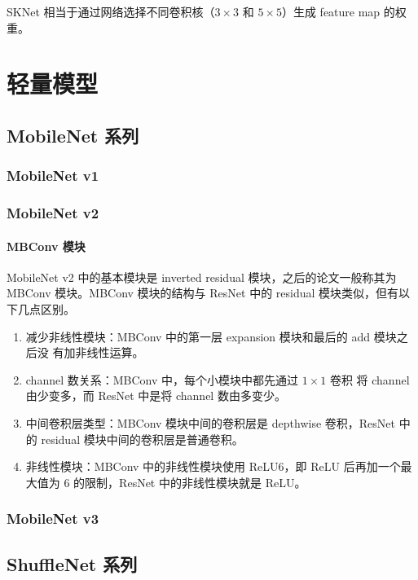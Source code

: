 SKNet 相当于通过网络选择不同卷积核（$3 \times 3$ 和 $5 \times 5$）生成 feature
map 的权重。

\chapter{轻量模型}

\section{MobileNet 系列}
\subsection{MobileNet v1}

\subsection{MobileNet v2}
\label{subsec:MobileNetv2}

\subsubsection{MBConv 模块}
MobileNet v2 中的基本模块是 inverted residual 模块，之后的论文一般称其为 MBConv
模块。MBConv 模块的结构与 ResNet 中的 residual 模块类似，但有以下几点区别。

\begin{enumerate}
  \item 减少非线性模块：MBConv 中的第一层 expansion 模块和最后的 add 模块之后没
    有加非线性运算。
  \item channel 数关系：MBConv 中，每个小模块中都先通过 $1 \times 1$ 卷积
    将 channel 由少变多，而 ResNet 中是将 channel 数由多变少。
  \item 中间卷积层类型：MBConv 模块中间的卷积层是 depthwise 卷积，ResNet 中的
    residual 模块中间的卷积层是普通卷积。
  \item 非线性模块：MBConv 中的非线性模块使用 ReLU6，即 ReLU 后再加一个最大值为
    6 的限制，ResNet 中的非线性模块就是 ReLU。
\end{enumerate}

\subsection{MobileNet v3}

\section{ShuffleNet 系列}
